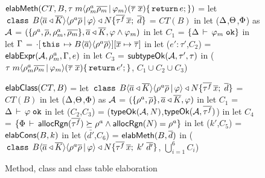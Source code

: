 \newcommand{\hdOf}[2]{\C{class}\; #1\angAlpha\inang{\rhoalloc\rhobar \,|\, #2} \extends \fbN}
\begin{figure}

\begin{codeml}
${\sf elabMeth}(CT, B, \tau \; m\langle \rho^a_m\overline{\rho_m} \,|\, \varphi_m \rangle (\overline{\tau} \; \overline{x})\{\,{\tt return}\, e;\})$ = 
  let $\hdOf{B}{\varphi}\{\bar{\tau^f}\,\xbar;\;\bar{d}\}$ = $CT(B)$ in
  let ($\Delta$,$\Theta$,$\Phi$) as ${\mathcal{A}}$ = 
            $(\{\rho^a,\overline{\rho},\rho^a_m,\overline{\rho_m}\},\overline{a} \triangleleft \overline{K},\varphi \wedge \varphi_m)$ in
  let $C_1$ = $\{\Delta\,\vdash\,\varphi_m \; \texttt{ok}\}$ in
  let $\Gamma$ = $\cdot[\,{\tt this}\, \mapsto B\langle \overline{a} \rangle\langle \rho^a\overline{\rho} \rangle][\overline{x} \mapsto \overline{\tau}]$ in
  let ($e':\tau'$,$C_2$) = ${\sf elabExpr} ({\mathcal{A}},\rho^a_m,\Gamma,e)$ in
  let $C_3$ = ${\sf subtypeOk}({{\mathcal{A}}},{\tau'},{\tau})$ in
    ($\tau \; m\langle \rho^a_m\overline{\rho_m} \,|\, \varphi_m \rangle (\overline{\tau} \;
    \overline{x})\{\,{\tt return}\, e';\}$, $C_1 \cup C_2 \cup C_3$)
\end{codeml}

\begin{codeml}
${\sf elabClass}(CT,B)$ = 
  let $\hdOf{B}{\varphi}\{\bar{\tau^f}\,\xbar;\;\bar{d}\}$ = $CT(B)$ in
  let ($\Delta$,$\Theta$,$\Phi$) as ${\mathcal{A}}$ = $(\{\rho^a,\overline{\rho}\},\overline{a} \triangleleft \overline{K},\varphi)$ in
  let $C_1$ = $\Delta\,\vdash\,\varphi \; \texttt{ok}$ in
  let ($C_2$,$C_3$) = (${\sf typeOk}({{\mathcal{A}}},{N})$,${\sf typeOk}({{\mathcal{A}}},{\overline{\tau^f}})$) in
  let $C_4$ = $\{\Phi\,\vdash\,{\sf allocRgn}(\overline{\tau^f}) \succeq \rho^a \wedge {\sf allocRgn}(N) = \rho^a\}$ in
  let ($k'$,$C_5$) = ${\sf elabCons}(B,k)$ in
  let ($\bar{d'}$,$C_6$) = ${\sf elabMeth}(B,\overline{d})$ in
    ($\hdOf{B}{\varphi}\{\bar{\tau^f}\,\xbar;\;k'\;\bar{d'}\}$, $\bigcup_{i=1}^6 C_i$)
\end{codeml}
%
%       

\caption{Method, class and class table elaboration}
\label{fig:fb-elabmeth}
\end{figure}
